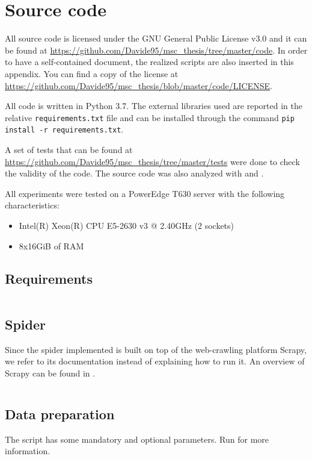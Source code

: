 \chapter{Source code}
All source code is licensed under the GNU General Public License v3.0 and it can be found at \url{https://github.com/Davide95/msc_thesis/tree/master/code}.
In order to have a self-contained document, the realized scripts are also inserted in this appendix.
You can find a copy of the license at \url{https://github.com/Davide95/msc_thesis/blob/master/code/LICENSE}.

All code is written in Python 3.7. The external libraries used are reported in the relative \texttt{requirements.txt} file and can be installed through the command \texttt{pip install -r requirements.txt}.

A set of tests that can be found at \url{https://github.com/Davide95/msc_thesis/tree/master/tests} were done to check the validity of the code.
The source code was also analyzed with  and .

All experiments were tested on a PowerEdge T630 server with the following characteristics:
\begin{itemize}
    \item Intel(R) Xeon(R) CPU E5-2630 v3 @ 2.40GHz (2 sockets)
    \item 8x16GiB of RAM
\end{itemize}

\section{Requirements}
\begin{minipage}{\linewidth}
    \inputminted{text}{../code/requirements.txt}
\end{minipage}

\pagebreak
\section{Spider} \label{spider}

Since the spider implemented is built on top of the web-crawling platform Scrapy, we refer to its documentation instead of explaining how to run it.
An overview of Scrapy can be found in \cite{kouzis2016learning}.

\inputminted{Python}{../code/custom_spider.py}

\pagebreak
\section{Data preparation} \label{preprocessing-code}
The script has some mandatory and optional parameters.
Run  for more information.

